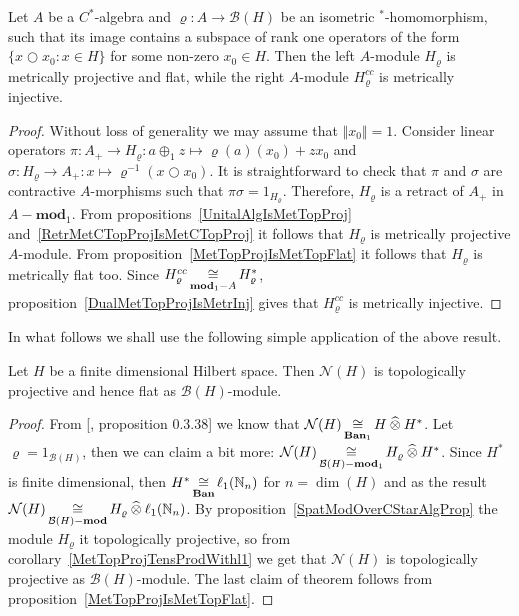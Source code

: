 \begin{proposition}\label{SpatModOverCStarAlgProp} Let $A$ be a $C^*$-algebra
and $\varrho:A\to\mathcal{B}(H)$ be an isometric ${}^*$-homomorphism, such that
its image contains a subspace of rank one operators of the 
form $ \{x\bigcirc x_0:x\in H \}$ for some non-zero $x_0\in H$. 
Then the left $A$-module $H_\varrho$ is metrically projective and flat, 
while the  right $A$-module $H_\varrho^{cc}$ is metrically injective.
\end{proposition}
\begin{proof} Without loss of generality we may assume that $\Vert x_0\Vert=1$.
Consider linear operators 
$\pi:A_+\to H_\varrho:a\oplus_1 z\mapsto \varrho(a)(x_0)+zx_0$ 
and $\sigma:H_\varrho\to A_+:x\mapsto \varrho^{-1}(x\bigcirc x_0)$. 
It is straightforward to check that $\pi$ and
$\sigma$ are contractive $A$-morphisms such that $\pi\sigma=1_{H_\varrho}$.
Therefore, $H_\varrho$ is a retract of $A_+$ in $A-\mathbf{mod}_1$. From
propositions~\ref{UnitalAlgIsMetTopProj} and~\ref{RetrMetCTopProjIsMetCTopProj} 
it follows that $H_\varrho$ is metrically projective $A$-module. From
proposition~\ref{MetTopProjIsMetTopFlat} it follows that $H_\varrho$ is
metrically flat too. Since $H_\varrho^{cc}\mathop{\mathbin{\cong}}\limits_{\mathbf{mod}_1-A}H_\varrho^*$,
proposition~\ref{DualMetTopProjIsMetrInj} gives that $H_\varrho^{cc}$ is
metrically injective.
\end{proof}

In what follows we shall use the following simple application of the above
result.

\begin{proposition}\label{FinDimNHModTopProjFlat} Let $H$ be a finite
dimensional Hilbert space. Then $\mathcal{N}(H)$ is topologically projective and
hence flat as $\mathcal{B}(H)$-module.
\end{proposition}
\begin{proof} From [\cite{HelBanLocConvAlg}, proposition 0.3.38] we know that
$\mathcal{N}(H)\mathop{\mathbin{\cong}}\limits_{\mathbf{Ban}_1}H\mathbin{\widehat{\otimes}} H^*$. Let
$\varrho=1_{\mathcal{B}(H)}$, then we can claim a bit more:
$\mathcal{N}(H)\mathop{\mathbin{\cong}}\limits_{\mathcal{B}(H)-\mathbf{mod}_1} H_\varrho\mathbin{\widehat{\otimes}} H^*$.
Since $H^*$ is finite dimensional, then
$H^*\mathop{\mathbin{\cong}}\limits_{\mathbf{Ban}}\ell_1(\mathbb{N}_n)$ for $n=\dim(H)$ and as the result
$\mathcal{N}(H)\mathop{\mathbin{\cong}}\limits_{\mathcal{B}(H)-\mathbf{mod}}
H_\varrho\mathbin{\widehat{\otimes}}\ell_1(\mathbb{N}_n)$. By
proposition~\ref{SpatModOverCStarAlgProp} the module $H_\varrho$ it
topologically projective, so from corollary~\ref{MetTopProjTensProdWithl1} we
get that $\mathcal{N}(H)$ is topologically projective as
$\mathcal{B}(H)$-module. The last claim of theorem follows from
proposition~\ref{MetTopProjIsMetTopFlat}.
\end{proof}

